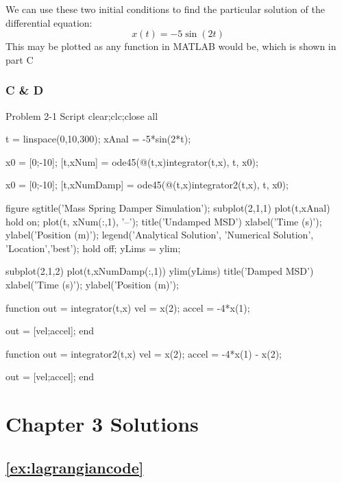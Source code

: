 \documentclass[10pt, openany, titlepage]{book}
\theoremstyle{definition}
\let\oldautoref\autoref
\renewcommand{\autoref}[1]{%
  \begingroup
  \hypersetup{linkcolor=black}%
  \oldautoref{#1}%
  \endgroup
}
\begin{document}
We can use these two initial conditions to find the particular solution of the differential equation:
$$x(t)=-5\sin(2t)$$
This may be plotted as any function in MATLAB would be, which is shown in part C
\subsubsection{C \& D}
\begin{matlabscript}{Problem 2-1 Script}
% 
clear;clc;close all

t = linspace(0,10,300);
xAnal = -5*sin(2*t);


x0 = [0;-10];
[t,xNum] = ode45(@(t,x)integrator(t,x), t, x0);


x0 = [0;-10];
[t,xNumDamp] = ode45(@(t,x)integrator2(t,x), t, x0);

figure
sgtitle('Mass Spring Damper Simulation');
subplot(2,1,1)
plot(t,xAnal)
hold on;
plot(t, xNum(:,1), '--');
title('Undamped MSD')
xlabel('Time (s)');
ylabel('Position (m)');
legend('Analytical Solution', 'Numerical Solution', 'Location','best');
hold off;
yLims = ylim;


subplot(2,1,2)
plot(t,xNumDamp(:,1))
ylim(yLims)
title('Damped MSD')
xlabel('Time (s)');
ylabel('Position (m)');


function out = integrator(t,x)
vel = x(2);
accel = -4*x(1);

out = [vel;accel];
end

function out = integrator2(t,x)
vel = x(2);
accel = -4*x(1) - x(2);

out = [vel;accel];
end
\end{matlabscript}

\section{Chapter 3 Solutions}


\subsection*{\texorpdfstring{\autoref{ex:lagrangiancode}}{Lagrangian In Code}}
\end{document}

